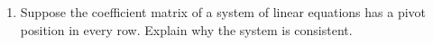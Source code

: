\documentclass[12pt]{article}
\begin{document}
\begin{multicols*}{2}
\begin{enumerate}
		\item Suppose the coefficient matrix of a system of linear equations has a pivot position in every row. Explain why the system is consistent.
		\vfill
	\end{enumerate}
\end{multicols*}
\end{document}
